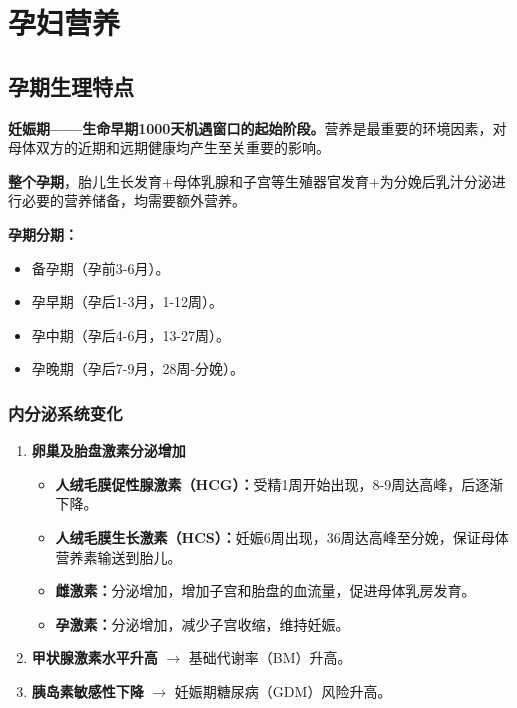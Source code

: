 \section{孕妇营养}

\subsection{孕期生理特点}

\begin{keybox}
\textbf{妊娠期——生命早期1000天机遇窗口的起始阶段。}营养是最重要的环境因素，对母体双方的近期和远期健康均产生至关重要的影响。

\textbf{整个孕期}，胎儿生长发育+母体乳腺和子宫等生殖器官发育+为分娩后乳汁分泌进行必要的营养储备，均需要额外营养。

\textbf{孕期分期：}
\begin{itemize}[leftmargin=*]
    \item 备孕期（孕前3-6月）。
    \item 孕早期（孕后1-3月，1-12周）。
    \item 孕中期（孕后4-6月，13-27周）。
    \item 孕晚期（孕后7-9月，28周-分娩）。
\end{itemize}
\end{keybox}

\subsubsection{内分泌系统变化}

\begin{keybox}
\begin{enumerate}[leftmargin=*]
    \item \textbf{卵巢及胎盘激素分泌增加}
    \begin{itemize}[leftmargin=*]
        \item \textbf{人绒毛膜促性腺激素（HCG）：}受精1周开始出现，8-9周达高峰，后逐渐下降。
        \item \textbf{人绒毛膜生长激素（HCS）：}妊娠6周出现，36周达高峰至分娩，保证母体营养素输送到胎儿。
        \item \textbf{雌激素：}分泌增加，增加子宫和胎盘的血流量，促进母体乳房发育。
        \item \textbf{孕激素：}分泌增加，减少子宫收缩，维持妊娠。
    \end{itemize}
    \item \textbf{甲状腺激素水平升高} $\rightarrow$ 基础代谢率（BM）升高。
    \item \textbf{胰岛素敏感性下降} $\rightarrow$ 妊娠期糖尿病（GDM）风险升高。
\end{enumerate}
\end{keybox}

